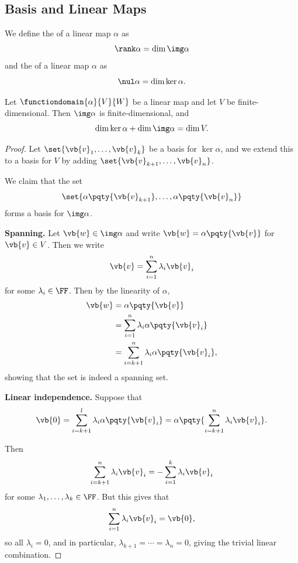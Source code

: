 \subsection{Basis and Linear Maps}

\begin{definition}
    We define the  of a linear map \(\alpha\) as
    \[
        \rank \alpha = \dim \img \alpha
    \]
    and the  of a linear map \(\alpha\) as
    \[
        \nul \alpha = \dim \ker \alpha.
    \]
\end{definition}

\begin{theorem}
    \label{thm:rank-nullity-thm}%
    Let \(\functiondomain{\alpha}{V}{W}\) be a linear map and let \(V\) be finite-dimensional. Then \(\img \alpha\) is finite-dimensional, and
    \[
        \dim \ker \alpha + \dim \img \alpha = \dim V.
    \]
\end{theorem}

\begin{proof}
    Let \(\set{\vb{v}_1, \ldots, \vb{v}_k}\) be a basis for \(\ker \alpha\), and we extend this to a basis for \(V\) by adding \(\set{\vb{v}_{k + 1}, \ldots, \vb{v}_n}\).

    We claim that the set
    \[
        \set{\alpha\pqty{\vb{v}_{k + 1}}, \ldots, \alpha\pqty{\vb{v}_n}}
    \]
    forms a basis for \(\img \alpha\).

    \textbf{Spanning.} Let \(\vb{w} \in \img \alpha\) and write \(\vb{w} = \alpha\pqty{\vb{v}}\) for \(\vb{v} \in V\). Then we write
    \[
        \vb{v} = \sum_{i = 1}^{n} \lambda_i \vb{v}_i
    \]
    for some \(\lambda_i \in \FF\). Then by the linearity of \(\alpha\),
    \begin{align*}
        \vb{w} &= \alpha\pqty{\vb{v}} \\
        &= \sum_{i = 1}^{n} \lambda_i \alpha\pqty{\vb{v}_i} \\
        &= \sum_{i = k + 1}^{n} \lambda_i \alpha\pqty{\vb{v}_i},
    \end{align*}
    showing that the set is indeed a spanning set.

    \textbf{Linear independence.} Suppose that
    \[
        \vb{0} = \sum_{i = k + 1}^{l} \lambda_i \alpha\pqty{\vb{v}_i} = \alpha \pqty{\sum_{i = k + 1}^{n} \lambda_i \vb{v}_i}.
    \]

    Then
    \[
        \sum_{i = k + 1}^{n} \lambda_i \vb{v}_i = - \sum_{i = 1}^{k} \lambda_i \vb{v}_i
    \]
    for some \(\lambda_1, \ldots, \lambda_k \in \FF\). But this gives that
    \[
        \sum_{i = 1}^{n} \lambda_i \vb{v}_i = \vb{0},
    \]
    so all \(\lambda_i = 0\), and in particular, \(\lambda_{k + 1} = \cdots = \lambda_n = 0\), giving the trivial linear combination.
\end{proof}

